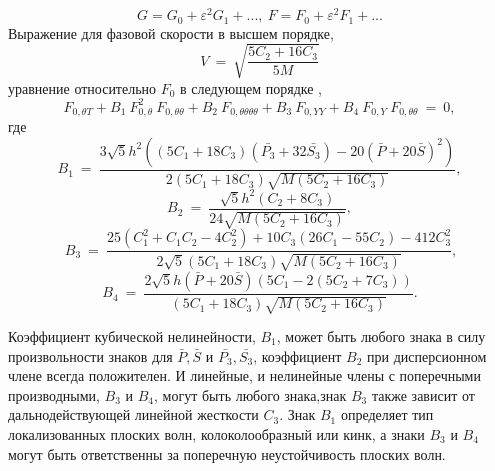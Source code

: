 \[
G = G_0 + \varepsilon^2 G_1+...,~F = F_0+\varepsilon^2 F_1+...
\]
Выражение для фазовой скорости в высшем порядке,
\begin{equation}
    V~=~\sqrt{\frac{5 C_2 + 16 C_3}{5 M}}
\end{equation}
уравнение относительно $F_0$ в следующем порядке \cite{PorOsAnt2020},
\begin{equation}
	F_{0,\theta T}+ B_1~ F_{0,\theta}^2~ F_{0,\theta \theta} +B_2 ~F_{0,\theta \theta \theta \theta}+ B_3~ F_{0,Y Y}+B_4~F_{0,Y}~ F_{0,\theta \theta}~=~0, \label{kpsh}
\end{equation}
где
\[
B_1~=~\frac{3 \sqrt{5} h^2 \left((5 C_1 +18 C_3)(\bar{P_3}+32 \bar{S_3})-20 (\bar{P}+20 \bar{S})^2 \right)}{2 (5 C_1+18 C_3) \sqrt{M (5 C_2+16 C_3)}},
\]
\[
B_2~=~\frac{\sqrt{5} h^2 (C_2+8 C_3)}{24 \sqrt{M (5 C_2+16 C_3)}},
\]
\[
~B_3~=~\frac{25 \left(C_1^2+C_1 C_2-4 C_2^2\right)+10 C_3 (26 C_1-55 C_2)-412 C_3^2}
{2 \sqrt{5} (5 C_1+18 C_3) \sqrt{M (5 C_2+16 C_3)}},
\]
\[
B_4~=~\frac{2 \sqrt{5} h (\bar{P}+20 \bar{S}) (5 C_1-2 (5 C_2+7 C_3))}{(5 C_1+18 C_3) \sqrt{M (5 C_2+16 C_3)}}.
\]

Коэффициент кубической нелинейности, $ B_1 $, может быть любого знака в силу произвольности знаков для $ \bar {P}, \bar{S} $ и $ \bar {P_3}, \bar {S_3} $, коэффициент $ B_2 $ при дисперсионном члене всегда положителен. И линейные, и нелинейные члены с поперечными производными, $ B_3 $ и $ B_4 $, могут быть любого знака,знак $ B_3 $ также зависит от дальнодействующей линейной жесткости $ C_3 $. Знак $ B_1 $ определяет тип локализованных плоских волн, колоколообразный или кинк, а знаки $ B_3 $ и $ B_4 $ могут быть ответственны за поперечную неустойчивость плоских волн.


